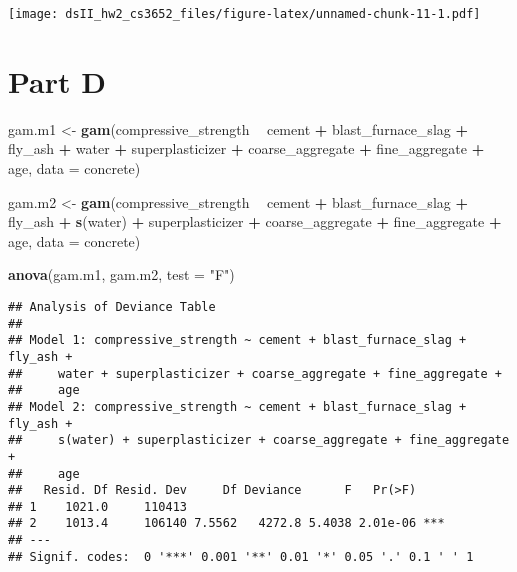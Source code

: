 \documentclass[]{article}
\newenvironment{Shaded}{\begin{snugshade}}{\end{snugshade}}
\newcommand{\KeywordTok}[1]{\textcolor[rgb]{0.13,0.29,0.53}{\textbf{#1}}}
\newcommand{\DataTypeTok}[1]{\textcolor[rgb]{0.13,0.29,0.53}{#1}}
\newcommand{\StringTok}[1]{\textcolor[rgb]{0.31,0.60,0.02}{#1}}
\newcommand{\OperatorTok}[1]{\textcolor[rgb]{0.81,0.36,0.00}{\textbf{#1}}}
\newcommand{\NormalTok}[1]{#1}
\begin{document}
\texttt{[image: dsII\_hw2\_cs3652\_files/figure-latex/unnamed-chunk-11-1.pdf]}

\section{Part D}\label{part-d}

\begin{Shaded}
\begin{Highlighting}[]
\NormalTok{gam.m1 <-}\StringTok{ }\KeywordTok{gam}\NormalTok{(compressive_strength }\OperatorTok{~}\StringTok{ }\NormalTok{cement }\OperatorTok{+}\StringTok{ }\NormalTok{blast_furnace_slag }\OperatorTok{+}\StringTok{ }\NormalTok{fly_ash }\OperatorTok{+}\StringTok{ }\NormalTok{water }\OperatorTok{+}\StringTok{ }\NormalTok{superplasticizer }\OperatorTok{+}\StringTok{ }\NormalTok{coarse_aggregate }\OperatorTok{+}\StringTok{ }\NormalTok{fine_aggregate }\OperatorTok{+}\StringTok{ }\NormalTok{age, }\DataTypeTok{data =}\NormalTok{ concrete)}

\NormalTok{gam.m2 <-}\StringTok{ }\KeywordTok{gam}\NormalTok{(compressive_strength }\OperatorTok{~}\StringTok{ }\NormalTok{cement }\OperatorTok{+}\StringTok{ }\NormalTok{blast_furnace_slag }\OperatorTok{+}\StringTok{ }\NormalTok{fly_ash }\OperatorTok{+}\StringTok{ }\KeywordTok{s}\NormalTok{(water) }\OperatorTok{+}\StringTok{ }\NormalTok{superplasticizer }\OperatorTok{+}\StringTok{ }\NormalTok{coarse_aggregate }\OperatorTok{+}\StringTok{ }\NormalTok{fine_aggregate }\OperatorTok{+}\StringTok{ }\NormalTok{age, }\DataTypeTok{data =}\NormalTok{ concrete)}

\KeywordTok{anova}\NormalTok{(gam.m1, gam.m2, }\DataTypeTok{test =} \StringTok{"F"}\NormalTok{)}
\end{Highlighting}
\end{Shaded}

\begin{verbatim}
## Analysis of Deviance Table
## 
## Model 1: compressive_strength ~ cement + blast_furnace_slag + fly_ash + 
##     water + superplasticizer + coarse_aggregate + fine_aggregate + 
##     age
## Model 2: compressive_strength ~ cement + blast_furnace_slag + fly_ash + 
##     s(water) + superplasticizer + coarse_aggregate + fine_aggregate + 
##     age
##   Resid. Df Resid. Dev     Df Deviance      F   Pr(>F)    
## 1    1021.0     110413                                    
## 2    1013.4     106140 7.5562   4272.8 5.4038 2.01e-06 ***
## ---
## Signif. codes:  0 '***' 0.001 '**' 0.01 '*' 0.05 '.' 0.1 ' ' 1
\end{verbatim}
\end{document}
